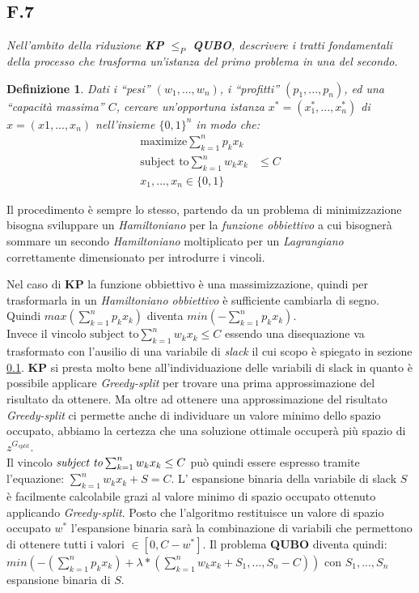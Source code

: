 \documentclass[a4paper]{article}
\newtheorem*{definition}{Definizione}
\begin{document}
\subsection{F.7}
\label{SEC:F6}
\emph{Nell’ambito della riduzione \textbf{KP} $\leq_P$ \textbf{QUBO}, descrivere i tratti fondamentali della processo che trasforma un'istanza del primo problema in una del secondo.}
\begin{definition} 
	Dati i “pesi” $(w_1, . . . , w_n)$, i “profitti” $(p_1, . . . , p_n)$, ed una “capacità massima” $C$, cercare un'opportuna istanza $x^* = (x^*_1, . . . , x^*_n)$ di $x = (x1, . . . , x_n)$ nell'insieme  $\{0, 1\}^n$ in modo che:
\begin{align*}
        \text{maximize} \sum_{k=1}^n p_kx_k&\\
	\text{subject to} \sum_{k=1}^n w_kx_k&\leq C\\
x_1,...,x_n \in \{0,1\}&
\end{align*}
\end{definition}
Il procedimento è sempre lo stesso, partendo da un problema di minimizzazione bisogna sviluppare un \textit{Hamiltoniano} per la \textit{funzione obbiettivo} a cui bisognerà sommare un secondo \textit{Hamiltoniano} moltiplicato per un \textit{Lagrangiano} correttamente dimensionato per introdurre i vincoli.

Nel caso di \textbf{KP} la funzione obbiettivo è una massimizzazione, quindi per trasformarla in un \textit{Hamiltoniano obbiettivo} è sufficiente cambiarla di segno.
Quindi $max(\sum_{k=1}^{n} p_kx_k )$ diventa $min(-\sum_{k=1}^{n} p_kx_k )$.\\
Invece il vincolo $\text{subject to} \sum_{k=1}^n w_kx_k \leq C$ essendo una disequazione va trasformato con l'ausilio di una variabile di \textit{slack} il cui scopo è spiegato in sezione \ref{SEC:F6}.
\textbf{KP} si presta molto bene all'individuazione delle variabili di slack in quanto è possibile applicare \textit{Greedy-split} per trovare una prima approssimazione del risultato da ottenere.
Ma oltre ad ottenere una approssimazione del risultato \textit{Greedy-split} ci permette anche di individuare un valore minimo dello spazio occupato, abbiamo la certezza che una soluzione ottimale occuperà più spazio di $z^{G_{split}}$.\\
Il vincolo $\text{\textit{subject to}} \sum_{k=1}^n w_kx_k \leq C$ può quindi essere espresso tramite l'equazione: $\sum_{k=1}^n w_kx_k + S=C$.
L' espansione binaria della variabile di slack $S$ è facilmente calcolabile grazi al valore minimo di spazio occupato ottenuto applicando \textit{Greedy-split}.
Posto che l'algoritmo restituisce un valore di spazio occupato $w^*$ l'espansione binaria sarà la combinazione di variabili che permettono di ottenere tutti i valori $\in [0,C-w^*]$.
Il problema \textbf{QUBO} diventa quindi: $ min(-(\sum_{k=1}^n p_kx_k) + \lambda * (\sum_{k=1}^n w_kx_k + S_1,...,S_n - C)) $ con $S_1, ..., S_n$ espansione binaria di $S$.
\end{document}
